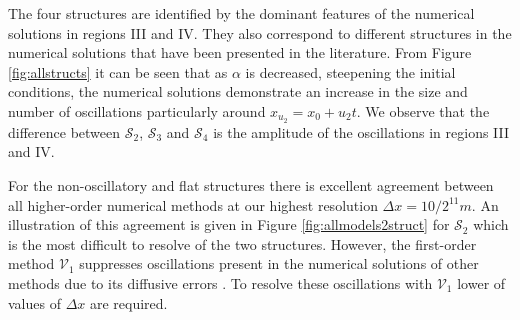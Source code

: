 \documentclass[times]{elsarticle}
\begin{document}
The four structures are identified by the dominant features of the numerical solutions in regions III and IV. They also correspond to different structures in the numerical solutions that have been presented in the literature. From Figure \ref{fig:allstructs} it can be seen that as $\alpha$ is decreased, steepening the initial conditions, the numerical solutions demonstrate an increase in the size and number of oscillations particularly around $x_{u_2} = x_0 + u_2 t$. We observe that the difference between $\mathcal{S}_2$, $\mathcal{S}_3$ and $\mathcal{S}_4$ is the amplitude of the oscillations in regions III and IV.

For the non-oscillatory and flat structures there is excellent agreement between all higher-order numerical methods at our highest resolution $\Delta x = 10/2^{11}m$. An illustration of this agreement is given in Figure \ref{fig:allmodels2struct} for $\mathcal{S}_2$ which is the most difficult to resolve of the two structures. However, the first-order method $\mathcal{V}_1$ suppresses oscillations present in the numerical solutions of other methods due to its diffusive errors \cite{Zoppou-etal-2017}. To resolve these oscillations with $\mathcal{V}_1$ lower of values of $\Delta x$ are required.
\end{document}
